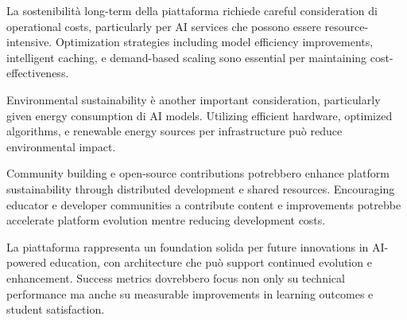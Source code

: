\documentclass[12pt,a4paper]{article}
\begin{document}
La sostenibilità long-term della piattaforma richiede careful consideration di operational costs, particularly per AI services che possono essere resource-intensive. Optimization strategies including model efficiency improvements, intelligent caching, e demand-based scaling sono essential per maintaining cost-effectiveness.

Environmental sustainability è another important consideration, particularly given energy consumption di AI models. Utilizing efficient hardware, optimized algorithms, e renewable energy sources per infrastructure può reduce environmental impact.

Community building e open-source contributions potrebbero enhance platform sustainability through distributed development e shared resources. Encouraging educator e developer communities a contribute content e improvements potrebbe accelerate platform evolution mentre reducing development costs.

La piattaforma rappresenta un foundation solida per future innovations in AI-powered education, con architecture che può support continued evolution e enhancement. Success metrics dovrebbero focus non only su technical performance ma anche su measurable improvements in learning outcomes e student satisfaction.
\end{document}
